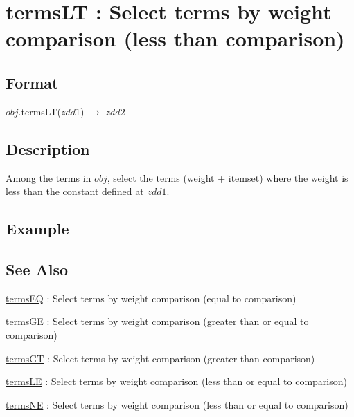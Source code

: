 
\section{termsLT :  Select terms by weight comparison (less than comparison)\label{sect:termsLT}}
\subsection*{Format}
$obj$.termsLT($zdd1$) $\rightarrow$ $zdd2$

\subsection*{Description}
Among the terms in $obj$, select the terms (weight + itemset) where the weight is less than the constant defined at $zdd1$.

\subsection*{Example}


\subsection*{See Also}
\hyperref[sect:termsEQ]{termsEQ} : Select terms by weight comparison (equal to comparison)

\hyperref[sect:termsGE]{termsGE} : Select terms by weight comparison (greater than or equal to comparison)

\hyperref[sect:termsGT]{termsGT} : Select terms by weight comparison (greater than comparison)

\hyperref[sect:termsLE]{termsLE} : Select terms by weight comparison (less than or equal to comparison)

\hyperref[sect:termsNE]{termsNE} : Select terms by weight comparison (less than or equal to comparison)



